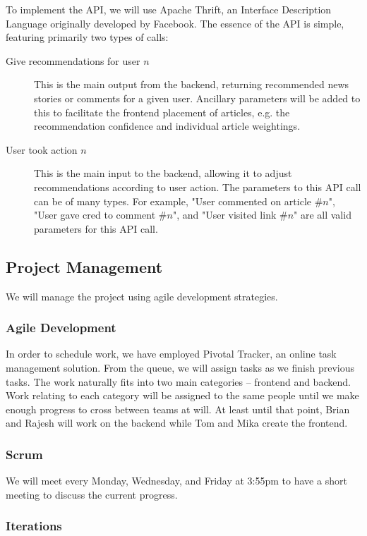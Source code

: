 \documentclass[11pt,letterpaper]{article}
\begin{document}
To implement the API, we will use Apache Thrift, an Interface Description Language originally developed by Facebook\cite{thrift}.
The essence of the API is simple, featuring primarily two types of calls:
\begin{description}
\item[Give recommendations for user $n$]
This is the main output from the backend, returning recommended news stories or comments for a given user.
Ancillary parameters will be added to this to facilitate the frontend placement of articles, e.g. the recommendation confidence and individual article weightings.
\item[User took action $n$]
This is the main input to the backend, allowing it to adjust recommendations according to user action.
The parameters to this API call can be of many types. For example, "User commented on article \#$n$", "User gave cred to comment \#$n$", and "User visited link \#$n$" are all valid parameters for this API call.
\end{description}

\subsection{Project Management}
We will manage the project using agile development strategies.

\subsubsection{Agile Development}
In order to schedule work, we have employed Pivotal Tracker, an online task management solution.
From the queue, we will assign tasks as we finish previous tasks.
The work naturally fits into two main categories -- frontend and backend.
Work relating to each category will be assigned to the same people until we make enough progress to cross between teams at will.
At least until that point, Brian and Rajesh will work on the backend while Tom and Mika create the frontend.

\subsubsection{Scrum}
We will meet every Monday, Wednesday, and Friday at 3:55pm to have a short meeting to discuss the current progress.

\subsubsection{Iterations}
\end{document}
